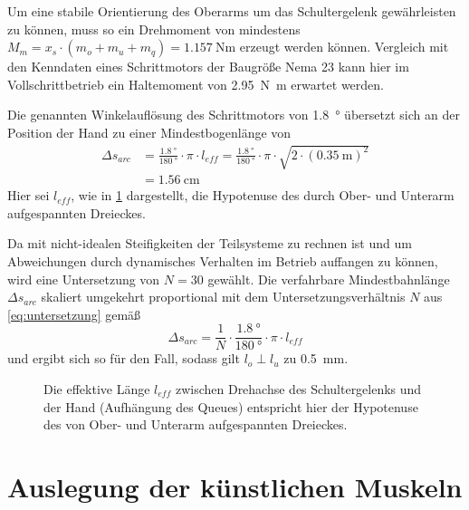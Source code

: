 		Um eine stabile Orientierung des Oberarms um das Schultergelenk gewährleisten zu können, muss so ein Drehmoment von mindestens \(M_m = x_s \cdot \left(m_o + m_u + m_q\right) = \SI{1,157}{\newton\metre}\) erzeugt werden können.
		Vergleich mit den Kenndaten eines Schrittmotors der Baugröße Nema 23 \cite{nanotec.specs} kann hier im Vollschrittbetrieb ein Haltemoment von \SI{2,95}{\newton\metre} erwartet werden.\par\medskip
		Die genannten Winkelauflösung des Schrittmotors von \SI{1,8}{\degree} übersetzt sich an der Position der Hand zu einer Mindestbogenlänge von
		\begin{align}
			\Delta s_{arc} 	&= \frac{\SI{1,8}{\degree}}{\SI{180}{\degree}} \cdot \pi \cdot l_{eff} = \frac{\SI{1,8}{\degree}}{\SI{180}{\degree}} \cdot \pi \cdot \sqrt{2 \cdot \left(\SI{0,35}{\metre}\right)^2} \nonumber \\
							&= \SI{1,56}{\cm}
		\end{align}
		Hier sei \(l_{eff}\), wie in \cref{fig:schultergelenk winkelaufloesung} dargestellt, die Hypotenuse des durch Ober- und Unterarm aufgespannten Dreieckes.\par
		Da mit nicht-idealen Steifigkeiten der Teilsysteme zu rechnen ist und um Abweichungen durch dynamisches Verhalten im Betrieb auffangen zu können, wird eine Untersetzung von \(N = 30\) gewählt.
		Die verfahrbare Mindestbahnlänge \(\Delta s_{arc}\) skaliert umgekehrt proportional mit dem Untersetzungsverhältnis \(N\) aus \cref{eq:untersetzung} gemäß
		\begin{equation}
			\Delta s_{arc} = \frac{1}{N} \cdot \frac{\SI{1,8}{\degree}}{\SI{180}{\degree}} \cdot \pi \cdot l_{eff}
		\end{equation}
		und ergibt sich so für den Fall, sodass gilt \(l_o \perp l_u\) zu \SI{0,5}{\mm}.
		\begin{figure}[h]
			\centering
			
			\caption[Die effektive Länge \(l_{eff}\) zwischen Drehachse des Schultergelenks und der Hand]{Die effektive Länge \(l_{eff}\) zwischen Drehachse des Schultergelenks und der Hand (Aufhängung des Queues) entspricht hier der Hypotenuse des von Ober- und Unterarm aufgespannten Dreieckes.}%
			\label{fig:schultergelenk winkelaufloesung}
		\end{figure}
	
	\section{Auslegung der künstlichen Muskeln}

